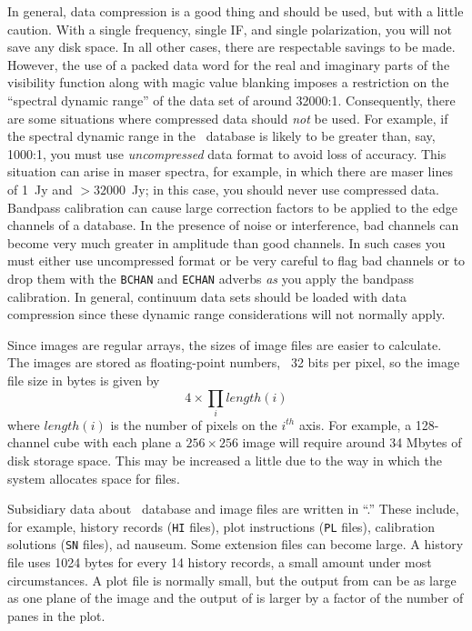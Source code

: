      In general, data compression is a good thing and should be used,
but with a little caution.  With a single frequency, single IF, and
single polarization, you will not save any disk space.  In all other
cases, there are respectable savings to be made.  However, the use of
a packed data word for the real and imaginary parts of the visibility
function along with magic value blanking imposes a restriction on the
``spectral dynamic range'' of the data set of around 32000:1.
Consequently, there are some situations where compressed data should
{\it not} be used.  For example, if the spectral dynamic range in the
\uv\ database is likely to be greater than, say, 1000:1, you must use
{\it uncompressed} data format to avoid loss of accuracy.  This
situation can arise in maser spectra, for example, in which there are
maser lines of 1~Jy and $ >32000$~Jy; in this case, you should never
use compressed data.  Bandpass calibration can cause large correction
factors to be applied to the edge channels of a database.  In the
presence of noise or interference, bad channels can become very much
greater in amplitude than good channels.  In such cases you must
either use uncompressed format or be very careful to flag bad channels
or to drop them with the {\tt BCHAN} and {\tt ECHAN} adverbs {\it as}
you apply the bandpass calibration.  In general, continuum data sets
should be loaded with data compression since these dynamic range
considerations will not normally apply.


     Since images are regular arrays, the sizes of image files are
easier to calculate.  The images are stored as floating-point numbers,
\ie\ 32 bits per pixel, so the image file size in bytes is given by
$$
     4 \times \prod_{i} length(i)
$$
where $length(i)$ is the number of pixels on the $i^{th}$ axis.  For
example, a 128-channel cube with each plane a $256 \times 256$ image
will require around 34 Mbytes of disk storage space.  This may be
increased a little due to the way in which the system allocates space
for files.


     Subsidiary data about \uv\ database and image files are written
in ``.''  These include, for example, history
records ({\tt HI} files), plot instructions ({\tt PL} files),
calibration solutions ({\tt SN} files), ad nauseum.  Some extension
files can become large.  A history file uses 1024 bytes for every 14
history records, a small amount under most circumstances.  A plot file
is normally small, but the output from {\tt {}} can be as
large as one plane of the image and the output of {\tt {}}
is larger by a factor of the number of panes in the plot.

